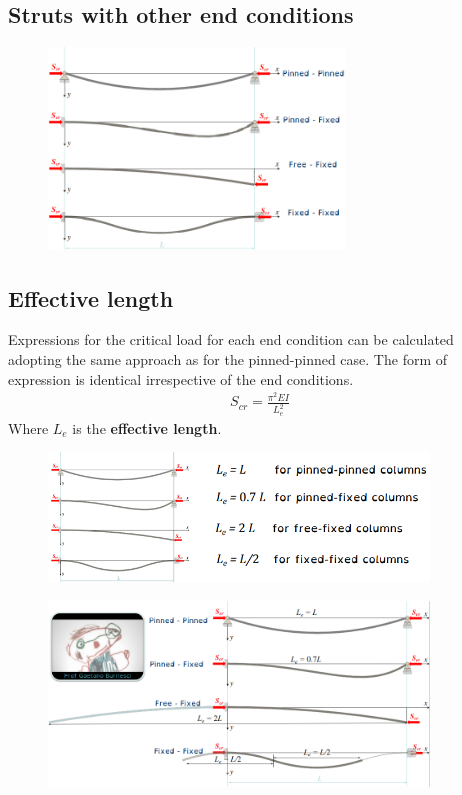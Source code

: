 \documentclass[class=report, crop=false, 12pt,a4paper]{standalone}
\begin{document}
\subsection{Struts with other end conditions}
\begin{figure}[H]
    \centering
    \includegraphics[width = 0.7\textwidth]{../img/diagram31.png}
    \caption{}
\end{figure}
\subsection{Effective length}
Expressions for the critical load for each end condition can be calculated adopting the same approach as for the pinned-pinned case. The form of expression is identical irrespective of the end conditions. 
\begin{align}
    S_{cr} = \frac{\pi^2 EI}{L^2_e}
\end{align}
Where $L_e$ is the \textbf{effective length}.
\begin{figure}[H]
    \centering
    \includegraphics[width = 0.9\textwidth]{../img/diagram32.png}
    \caption{}
\end{figure}
\begin{figure}[H]
    \centering
    \includegraphics[width = 0.9\textwidth]{../img/diagram33.png}
    \caption{}
\end{figure}
\end{document}
